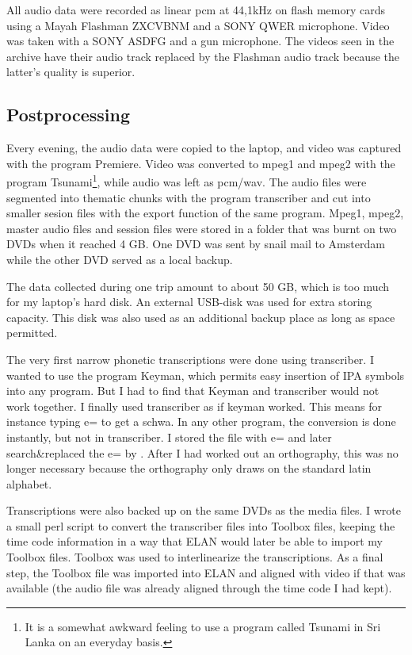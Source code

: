 All audio data were recorded as linear pcm at 44,1kHz on flash memory cards using a Mayah Flashman ZXCVBNM and a SONY QWER microphone. Video was taken with a SONY ASDFG and a gun microphone. The videos seen in the archive have their audio track replaced by the Flashman audio track because the latter's quality is superior.

\subsection{Postprocessing}
Every evening, the audio data were copied to the laptop, and video was captured with the program Premiere. Video was converted to mpeg1 and mpeg2 with the program Tsunami\footnote{It is a somewhat awkward feeling to use a program called Tsunami in Sri Lanka on an everyday basis.}, while audio was left as pcm/wav. The audio files were segmented into thematic chunks with the program transcriber and cut into smaller sesion files with the export function of the same program. Mpeg1, mpeg2, master audio files and session files were stored in a folder that was burnt on two DVDs when it reached 4 GB. One DVD was sent by snail mail to Amsterdam while the other DVD served as a local backup. 

The data collected during one trip amount to about 50 GB, which is too much for my laptop's hard disk. An external USB-disk was used for extra storing capacity. This disk was also used as an additional backup place as long as space permitted.

The very first narrow phonetic transcriptions were done using transcriber. I wanted to use the program Keyman, which permits easy insertion of IPA symbols into any program. But I had to find that Keyman and transcriber would not work together. I finally used transcriber as if keyman worked. This means for instance typing e= to get a schwa. In any other program, the conversion is done instantly, but not in transcriber. I stored the file with e= and later search\&replaced the e= by \E. After I had worked out an orthography, this was no longer necessary because the orthography only draws on the standard latin alphabet.

Transcriptions were also backed up on the same DVDs as the media files. I wrote a small perl script to convert the transcriber files into Toolbox files, keeping the time code information in a way that ELAN would later be able to import my Toolbox files. Toolbox was used to interlinearize the transcriptions. As a final step, the Toolbox file was imported into ELAN and aligned with video if that was available (the audio file was already aligned through the time code I had kept).
